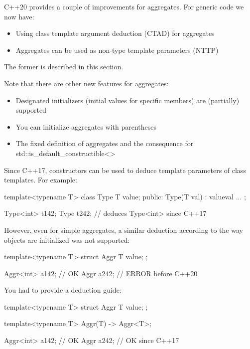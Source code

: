 
C++20 provides a couple of improvements for aggregates. For generic code we now have:

\begin{itemize}
\item 
Using class template argument deduction (CTAD) for aggregates

\item 
Aggregates can be used as non-type template parameters (NTTP)
\end{itemize}

The former is described in this section.

Note that there are other new features for aggregates:

\begin{itemize}
\item 
Designated initializers (initial values for specific members) are (partially) supported

\item 
You can initialize aggregates with parentheses

\item 
The fixed definition of aggregates and the consequence for std::is\_default\_constructible<>
\end{itemize}



Since C++17, constructors can be used to deduce template parameters of class templates. For example:

\begin{cpp}
template<typename T>
class Type {
	T value;
public:
	Type(T val)
	: value{val} {
	}
	...
};

Type<int> t1{42};
Type t2{42}; // deduces Type<int> since C++17
\end{cpp}

However, even for simple aggregates, a similar deduction according to the way objects are initialized was not supported:

\begin{cpp}
template<typename T>
struct Aggr {
	T value;
};

Aggr<int> a1{42}; // OK
Aggr a2{42}; // ERROR before C++20
\end{cpp}

You had to provide a deduction guide:

\begin{cpp}
template<typename T>
struct Aggr {
	T value;
};

template<typename T>
Aggr(T) -> Aggr<T>;

Aggr<int> a1{42}; // OK
Aggr a2{42}; // OK since C++17
\end{cpp}

